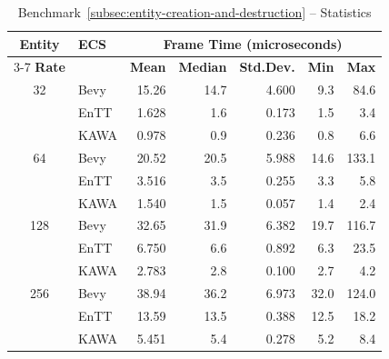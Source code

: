 \documentclass[conference]{IEEEtran}
\begin{document}
    \begin{table}[htbp]
        \caption{Benchmark~\ref{subsec:entity-creation-and-destruction} – Statistics}
        \begin{center}
            \begin{tabular}{|c|l|r|r|r|r|r|}
                \hline
                \textbf{Entity} & \textbf{ECS} & \multicolumn{5}{|c|}{\textbf{Frame Time (microseconds)}} \\
                \cline{3-7}
                \textbf{Rate} & & \textbf{Mean} & \textbf{Median} & \textbf{Std.Dev.} & \textbf{Min} & \textbf{Max} \\
                \hline
                32   & Bevy           & 15.26         & 14.7            & 4.600             & 9.3          & 84.6         \\
                & EnTT               & 1.628         & 1.6             & 0.173             & 1.5          & 3.4          \\
                & KAWA             & 0.978         & 0.9             & 0.236             & 0.8          & 6.6          \\
                \hline
                64   & Bevy           & 20.52         & 20.5            & 5.988             & 14.6         & 133.1        \\
                & EnTT               & 3.516         & 3.5             & 0.255             & 3.3          & 5.8          \\
                & KAWA             & 1.540         & 1.5             & 0.057             & 1.4          & 2.4          \\
                \hline
                128  & Bevy           & 32.65         & 31.9            & 6.382             & 19.7         & 116.7        \\
                & EnTT               & 6.750         & 6.6             & 0.892             & 6.3          & 23.5         \\
                & KAWA             & 2.783         & 2.8             & 0.100             & 2.7          & 4.2          \\
                \hline
                256  & Bevy           & 38.94         & 36.2            & 6.973             & 32.0         & 124.0        \\
                & EnTT               & 13.59         & 13.5            & 0.388             & 12.5         & 18.2         \\
                & KAWA             & 5.451         & 5.4             & 0.278             & 5.2          & 8.4          \\

\end{tabular}
\end{center}
\end{table}
\end{document}
